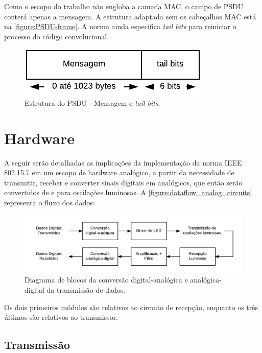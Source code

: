 	Como o escopo do trabalho não engloba a camada MAC, o campo de PSDU conterá apenas a mensagem. A estrutura adaptada sem os cabeçalhos MAC está na \autoref{figure:PSDU-frame}. A norma ainda especifica \textit{tail bits} para reiniciar o processo do código convolucional.

	\begin{figure}[h]
		\caption{\label{figure:PSDU-frame}Estrutura do PSDU - Mensagem e \textit{tail bits}.}
		\centering
		\includegraphics[width=0.4\textheight]{frame/PSDU.pdf}
	\end{figure}

	\section{Hardware}\label{sec:method-hardware}

	A seguir serão detalhadas as implicações da implementação da norma IEEE 802.15.7 em um escopo de hardware analógico, a partir da necessidade de transmitir, receber e converter sinais digitais em analógicos, que então serão convertidos de e para oscilações luminosas. A \autoref{figure:dataflow_analog_circuits} representa o fluxo dos dados:

	\begin{figure}[h!]
		\caption{\label{figure:dataflow_analog_circuits}Diagrama de blocos da conversão digital-analógica e analógica-digital da transmissão de dados.}
		\centering
		\includegraphics[width=0.6\textheight]{circuits/dataflow_analog_circuits.pdf}
	\end{figure}
	Os dois primeiros módulos são relativos ao circuito de recepção, enquanto os três últimos são relativos ao transmissor.

	\subsection{Transmissão}

